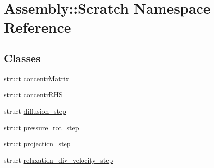 \hypertarget{namespace_assembly_1_1_scratch}{}\section{Assembly\+:\+:Scratch Namespace Reference}
\label{namespace_assembly_1_1_scratch}
\subsection*{Classes}
\begin{DoxyCompactItemize}
\item 
struct \hyperlink{struct_assembly_1_1_scratch_1_1concentr_matrix}{concentr\+Matrix}
\item 
struct \hyperlink{struct_assembly_1_1_scratch_1_1concentr_r_h_s}{concentr\+R\+H\+S}
\item 
struct \hyperlink{struct_assembly_1_1_scratch_1_1diffusion__step}{diffusion\+\_\+step}
\item 
struct \hyperlink{struct_assembly_1_1_scratch_1_1pressure__rot__step}{pressure\+\_\+rot\+\_\+step}
\item 
struct \hyperlink{struct_assembly_1_1_scratch_1_1projection__step}{projection\+\_\+step}
\item 
struct \hyperlink{struct_assembly_1_1_scratch_1_1relaxation__div__velocity__step}{relaxation\+\_\+div\+\_\+velocity\+\_\+step}
\end{DoxyCompactItemize}
